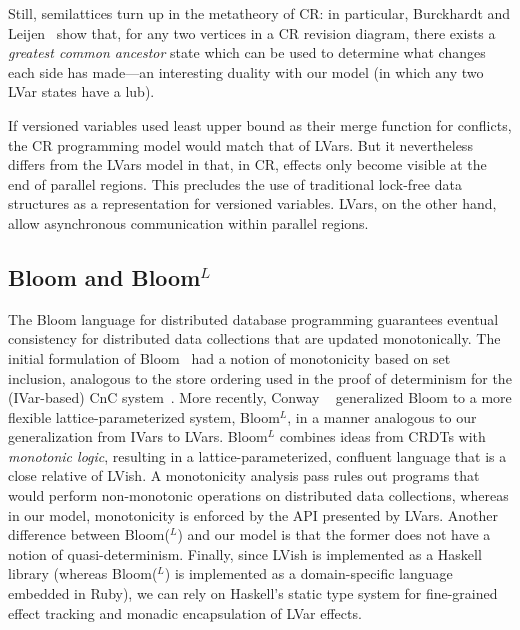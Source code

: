 \documentclass{article}
\begin{document}
Still, semilattices turn up in the metatheory of CR: in particular,
Burckhardt and Leijen~\cite{semantics-concurrent-revisions} show that,
for any two vertices in a CR revision diagram, there exists a
\emph{greatest common ancestor} state which can be used to determine
what changes each side has made---an interesting duality with our
model (in which any two LVar states have a lub). 

If versioned variables used least upper bound as their merge function
for conflicts, the CR programming model would match that of LVars.    But it nevertheless
differs from the LVars model in that, in CR, effects only become
visible at the end of parallel regions. 
This precludes the use of traditional lock-free data structures as a
representation for versioned variables.  LVars, on the other hand,
allow asynchronous communication within parallel regions.

\subsection{Bloom and Bloom$^L$}

The Bloom language for distributed database programming guarantees
eventual consistency for distributed data collections that are updated
monotonically.  The initial formulation of Bloom~\cite{bloom-cidr} had
a notion of monotonicity based on set inclusion, analogous to the
store ordering used in the proof of determinism for the (IVar-based)
CnC system~\cite{CnC}.  More recently, Conway \etal~\cite{blooml}
generalized Bloom to a more flexible lattice-parameterized system,
Bloom$^L$, in a manner analogous to our generalization from IVars to
LVars.  Bloom$^L$ combines ideas from CRDTs with \emph{monotonic
  logic}, resulting in a lattice-parameterized, confluent language
that is a close relative of LVish.  A monotonicity analysis pass rules
out programs that would perform non-monotonic operations on
distributed data collections, whereas in our model, monotonicity is
enforced by the API presented by LVars.  Another difference between
Bloom($^L$) and our model is that the former does not have a notion of
quasi-determinism.  Finally, since LVish is implemented as a
Haskell library (whereas Bloom($^L$) is implemented as a
domain-specific language embedded in Ruby), we can rely on Haskell's
static type system for fine-grained effect tracking and monadic
encapsulation of LVar effects.
\end{document}
